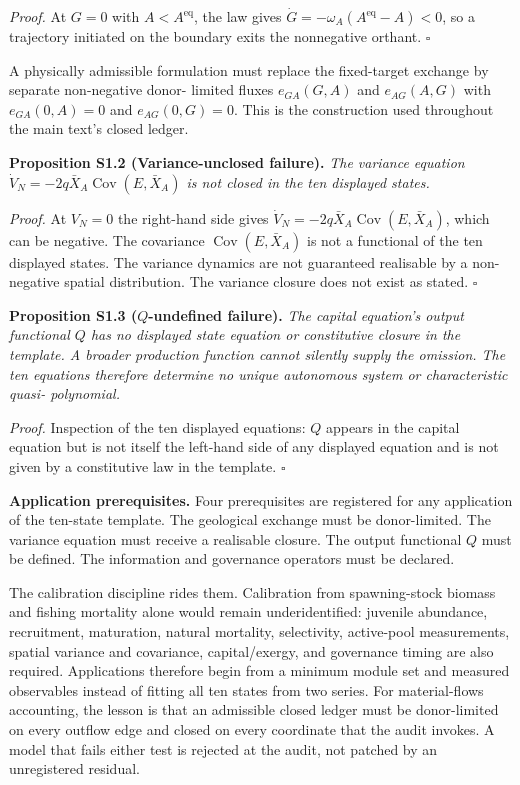 \documentclass[11pt]{article}
\begin{document}
\emph{Proof.} At \(G = 0\) with \(A < A^{\mathrm{eq}}\), the law gives \(\dot G = -\omega_A(A^{\mathrm{eq}} - A) < 0\), so a trajectory initiated on the boundary exits the nonnegative orthant. \(\square\)

A physically admissible formulation must replace the fixed-target exchange by separate non-negative donor- limited fluxes \(e_{GA}(G, A)\) and \(e_{AG}(A, G)\) with \(e_{GA}(0, A) = 0\) and \(e_{AG}(0, G) = 0\). This is the construction used throughout the main text's closed ledger.

\textbf{Proposition S1.2 (Variance-unclosed failure).} \emph{The variance equation \(\dot V_N = -2q\bar X_A \operatorname{Cov}(E, \bar X_A)\) is not closed in the ten displayed states.}

\emph{Proof.} At \(V_N = 0\) the right-hand side gives \(\dot V_N = -2q\bar X_A \operatorname{Cov}(E, \bar X_A)\), which can be negative. The covariance \(\operatorname{Cov}(E, \bar X_A)\) is not a functional of the ten displayed states. The variance dynamics are not guaranteed realisable by a non-negative spatial distribution. The variance closure does not exist as stated. \(\square\)

\textbf{Proposition S1.3 (\(Q\)-undefined failure).} \emph{The capital equation's output functional \(Q\) has no displayed state equation or constitutive closure in the template. A broader production function cannot silently supply the omission. The ten equations therefore determine no unique autonomous system or characteristic quasi- polynomial.}

\emph{Proof.} Inspection of the ten displayed equations: \(Q\) appears in the capital equation but is not itself the left-hand side of any displayed equation and is not given by a constitutive law in the template. \(\square\)

\textbf{Application prerequisites.} Four prerequisites are registered for any application of the ten-state template. The geological exchange must be donor-limited. The variance equation must receive a realisable closure. The output functional \(Q\) must be defined. The information and governance operators must be declared.

The calibration discipline rides them. Calibration from spawning-stock biomass and fishing mortality alone would remain underidentified: juvenile abundance, recruitment, maturation, natural mortality, selectivity, active-pool measurements, spatial variance and covariance, capital/\allowbreak{}exergy, and governance timing are also required. Applications therefore begin from a minimum module set and measured observables instead of fitting all ten states from two series. For material-flows accounting, the lesson is that an admissible closed ledger must be donor-limited on every outflow edge and closed on every coordinate that the audit invokes. A model that fails either test is rejected at the audit, not patched by an unregistered residual.
\end{document}
